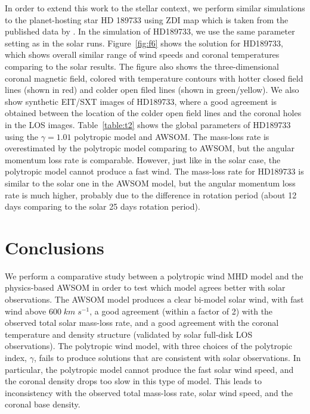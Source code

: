 \documentclass[apj]{emulateapj}
\begin{document}
In order to extend this work to the stellar context, we perform similar simulations to the planet-hosting star HD 189733 using ZDI map which is taken from the published data by \cite{Fares10}. In the simulation of HD189733, we use the same parameter setting as in the solar runs. Figure~\ref{fig:f6} shows the solution for HD189733, which shows overall similar range of wind speeds and coronal temperatures comparing to the solar results. The figure also shows the three-dimensional coronal magnetic field, colored with temperature contours with hotter closed field lines (shown in red) and colder open filed lines (shown in green/yellow). We also show synthetic EIT/SXT images of HD189733, where a good agreement is obtained between the location of the colder open field lines and the coronal holes in the LOS images. Table~\ref{table:t2} shows the global parameters of HD189733 using the $\gamma=1.01$ polytropic model and AWSOM. The mass-loss rate is overestimated by the polytropic model comparing to AWSOM, but the angular momentum loss rate is comparable. However, just like in the solar case, the polytropic model cannot produce a fast wind. The mass-loss rate for HD189733 is similar to the solar one in the AWSOM model, but the angular momentum loss rate is much higher, probably due to the difference in rotation period (about 12 days comparing to the solar 25 days rotation period).

\section{Conclusions}
\label{sec:Conclusions}

We perform a comparative study between a polytropic wind MHD model and the physics-based AWSOM in order to test which model agrees better with solar observations. The AWSOM model produces a clear bi-model solar wind, with fast wind above $600\;km\;s^{-1}$, a good agreement (within a factor of 2) with the observed total solar mass-loss rate, and a good agreement with the coronal temperature and density structure (validated by solar full-disk LOS observations). The polytropic wind model, with three choices of the polytropic index, $\gamma$, fails to produce solutions that are consistent with solar observations. In particular, the polytropic model cannot produce the fast solar wind speed, and the coronal density drops too slow in this type of model. This leads to inconsistency with the observed total mass-loss rate, solar wind speed, and the coronal base density. 
\end{document}
